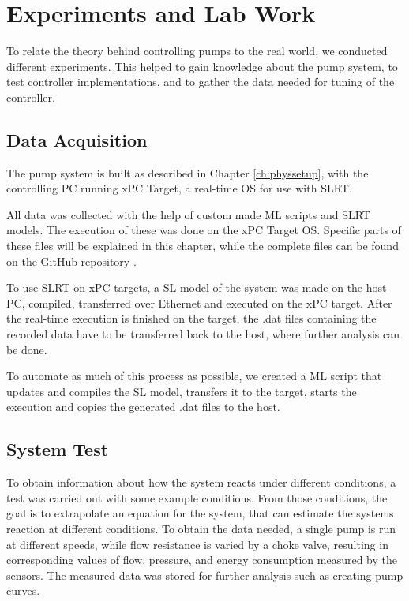 \chapter{Experiments and Lab Work}\label{ch:experiment}
To relate the theory behind controlling pumps to the real world,
we conducted different experiments.
This helped to gain knowledge about the pump system,
to test controller implementations, and to gather the data needed for tuning of the controller.

\section{Data Acquisition}\label{sec:data_gathering}
The pump system is built as described in Chapter \ref{ch:physsetup},
with the controlling PC running xPC Target,
a real-time OS for use with SLRT. 

All data was collected with the help of custom made 
ML scripts and SLRT models.
The execution of these was done on the xPC Target OS.
Specific parts of these files will be explained in this chapter,
while the complete files can be found on the GitHub repository \cite{GitHub}.

To use SLRT on xPC targets, a SL model of the system was made on the host PC,
compiled, transferred over Ethernet and executed on the xPC target.
After the real-time execution is finished on the target,
the .dat files containing the recorded data have to be transferred back to the host,
where further analysis can be done.

To automate as much of this process as possible,
we created a ML script that updates and compiles the SL model, transfers it to the target,
starts the execution and copies the generated .dat files to the host.

\section{System Test}\label{sec:system_test} 

To obtain information about how the system reacts under different conditions,
a test was carried out with some example conditions.
From those conditions, the goal is to extrapolate an equation for the system,
that can estimate the systems reaction at different conditions.
To obtain the data needed,
a single pump is run at different speeds,
while flow resistance is varied by a choke valve,
resulting in corresponding values of flow, pressure, and energy consumption
measured by the sensors.
The measured data was stored for further analysis such as creating pump curves.

